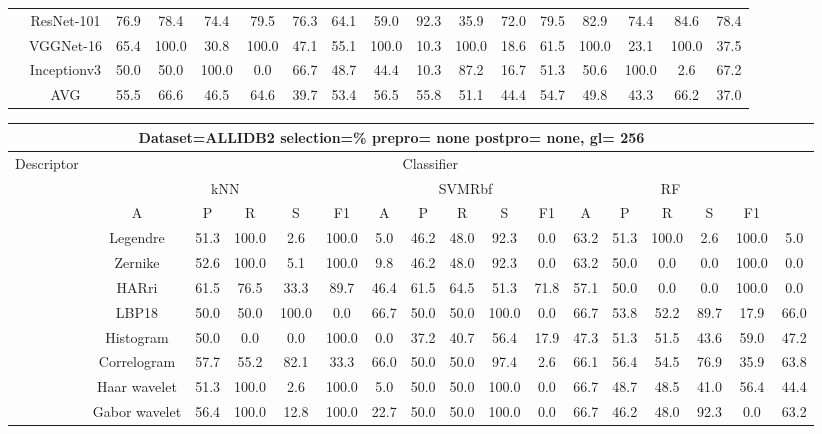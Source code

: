 \documentclass[12pt,italian]{article}
\begin{document}
\begin{tiny}
\begin{longtable}{lcccccccccccccccc}
& ResNet-101 & 76.9 & 78.4 & 74.4 & 79.5 & 76.3 & 64.1 & 59.0 & 92.3 & 35.9 & 72.0 & 79.5 & 82.9 & 74.4 & 84.6 & 78.4 \\ 
& VGGNet-16 & 65.4 & 100.0 & 30.8 & 100.0 & 47.1 & 55.1 & 100.0 & 10.3 & 100.0 & 18.6 & 61.5 & 100.0 & 23.1 & 100.0 & 37.5 \\ 
& Inceptionv3 & 50.0 & 50.0 & 100.0 &  0.0 & 66.7 & 48.7 & 44.4 & 10.3 & 87.2 & 16.7 & 51.3 & 50.6 & 100.0 &  2.6 & 67.2 \\ 
\hline
& AVG & 55.5 & 66.6 & 46.5 & 64.6 & 39.7 & 53.4 & 56.5 & 55.8 & 51.1 & 44.4 & 54.7 & 49.8 & 43.3 & 66.2 & 37.0 \\ 
\hline
\bottomrule
\end{longtable} 

 \pagebreak 
\begin{longtable}{lcccccccccccccccc}
\toprule
\multicolumn{16}{c}{Dataset=ALLIDB2 selection=\% prepro= none postpro= none, gl= 256} \\ 
\toprule
Descriptor & \multicolumn{15}{c}{Classifier} \\ 
& \multicolumn{5}{c}{kNN} & \multicolumn{5}{c}{SVMRbf} & \multicolumn{5}{c}{RF} \\ 
& A & P & R & S & F1 & A & P & R & S & F1 & A & P & R & S & F1 \\ 
\midrule
& Legendre & 51.3 & 100.0 &  2.6 & 100.0 &  5.0 & 46.2 & 48.0 & 92.3 &  0.0 & 63.2 & 51.3 & 100.0 &  2.6 & 100.0 &  5.0 \\ 
& Zernike & 52.6 & 100.0 &  5.1 & 100.0 &  9.8 & 46.2 & 48.0 & 92.3 &  0.0 & 63.2 & 50.0 &  0.0 &  0.0 & 100.0 &  0.0 \\ 
& HARri & 61.5 & 76.5 & 33.3 & 89.7 & 46.4 & 61.5 & 64.5 & 51.3 & 71.8 & 57.1 & 50.0 &  0.0 &  0.0 & 100.0 &  0.0 \\ 
& LBP18 & 50.0 & 50.0 & 100.0 &  0.0 & 66.7 & 50.0 & 50.0 & 100.0 &  0.0 & 66.7 & 53.8 & 52.2 & 89.7 & 17.9 & 66.0 \\ 
& Histogram & 50.0 &  0.0 &  0.0 & 100.0 &  0.0 & 37.2 & 40.7 & 56.4 & 17.9 & 47.3 & 51.3 & 51.5 & 43.6 & 59.0 & 47.2 \\ 
& Correlogram & 57.7 & 55.2 & 82.1 & 33.3 & 66.0 & 50.0 & 50.0 & 97.4 &  2.6 & 66.1 & 56.4 & 54.5 & 76.9 & 35.9 & 63.8 \\ 
& Haar wavelet & 51.3 & 100.0 &  2.6 & 100.0 &  5.0 & 50.0 & 50.0 & 100.0 &  0.0 & 66.7 & 48.7 & 48.5 & 41.0 & 56.4 & 44.4 \\ 
& Gabor wavelet & 56.4 & 100.0 & 12.8 & 100.0 & 22.7 & 50.0 & 50.0 & 100.0 &  0.0 & 66.7 & 46.2 & 48.0 & 92.3 &  0.0 & 63.2 \\ 

\end{longtable}
\end{tiny}
\end{document}
